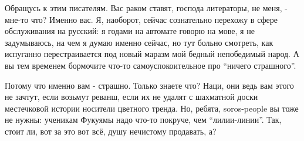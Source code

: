 Обращусь к этим писателям. Вас раком ставят, господа литераторы, не меня, -
мне-то что? Именно вас. Я, наоборот, сейчас сознательно перехожу в сфере
обслуживания на русский: я годами на автомате говорю на мове, я не задумываюсь,
на чем я думаю именно сейчас, но тут больно смотреть, как испуганно
перестраивается под новый маразм мой бедный непобедимый народ. А вы тем
временем бормочите что-то самоуспокоительное про \enquote{ничего страшного}. 

Потому что именно вам - страшно. Только знаете что? Наци, они ведь вам этого не
зачтут, если возьмут реванш, если их не удалят с шахматной доски местечковой
истории носители цветного тренда. Но, ребята, soros-people вы тоже не нужны:
ученикам Фукуямы надо что-то покруче, чем \enquote{лилии-линии}. Так, стоит ли, вот за
это вот всё, душу нечистому продавать, а?

